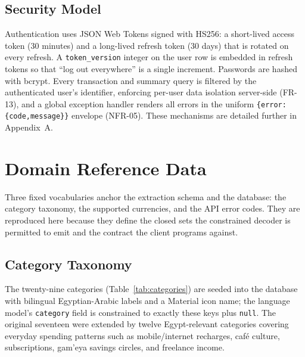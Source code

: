 \subsection{Security Model}

Authentication uses JSON Web Tokens signed with HS256: a short-lived access token
(30 minutes) and a long-lived refresh token (30 days) that is rotated on every
refresh. A \texttt{token\_version} integer on the user row is embedded in refresh
tokens so that ``log out everywhere'' is a single increment. Passwords are hashed
with bcrypt. Every transaction and summary query is filtered by the authenticated
user's identifier, enforcing per-user data isolation server-side (FR-13), and a
global exception handler renders all errors in the uniform
\texttt{\{error:\{code,message\}\}} envelope (NFR-05). These mechanisms are
detailed further in Appendix~A.

\section{Domain Reference Data}

Three fixed vocabularies anchor the extraction schema and the database: the
category taxonomy, the supported currencies, and the API error codes. They are
reproduced here because they define the closed sets the constrained decoder is
permitted to emit and the contract the client programs against.

\subsection{Category Taxonomy}

The twenty-nine categories (Table~\ref{tab:categories}) are seeded into the
database with bilingual Egyptian-Arabic labels and a Material icon name; the
language model's \texttt{category} field is constrained to exactly these keys
plus \texttt{null}. The original seventeen were extended by twelve
Egypt-relevant categories covering everyday spending patterns such as
mobile/internet recharges, café culture, subscriptions, gam'eya savings
circles, and freelance income.

